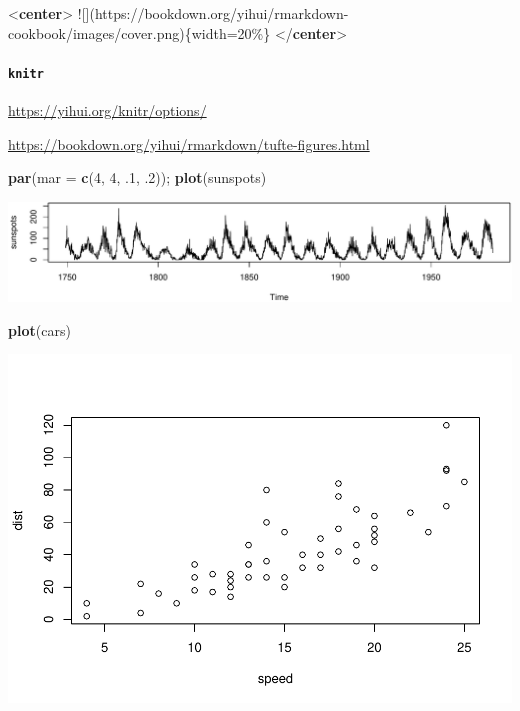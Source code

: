 \documentclass[
]{book}
\newenvironment{Shaded}{\begin{snugshade}}{\end{snugshade}}
\newcommand{\AlertTok}[1]{\textcolor[rgb]{0.94,0.16,0.16}{#1}}
\newcommand{\AttributeTok}[1]{\textcolor[rgb]{0.13,0.29,0.53}{#1}}
\newcommand{\DataTypeTok}[1]{\textcolor[rgb]{0.13,0.29,0.53}{#1}}
\newcommand{\DecValTok}[1]{\textcolor[rgb]{0.00,0.00,0.81}{#1}}
\newcommand{\FunctionTok}[1]{\textcolor[rgb]{0.13,0.29,0.53}{\textbf{#1}}}
\newcommand{\KeywordTok}[1]{\textcolor[rgb]{0.13,0.29,0.53}{\textbf{#1}}}
\newcommand{\NormalTok}[1]{#1}
\theoremstyle{definition}
\theoremstyle{definition}
\theoremstyle{definition}
\theoremstyle{definition}
\theoremstyle{remark}
\begin{document}
\begin{Shaded}
\begin{Highlighting}[]
\DataTypeTok{\textless{}}\KeywordTok{center}\DataTypeTok{\textgreater{}}
\AlertTok{![](https://bookdown.org/yihui/rmarkdown{-}cookbook/images/cover.png)}\NormalTok{\{width=20\%\}}
\DataTypeTok{\textless{}/}\KeywordTok{center}\DataTypeTok{\textgreater{}}
\end{Highlighting}
\end{Shaded}

\paragraph{\texorpdfstring{\texttt{knitr}}{knitr}}\label{knitr}

\url{https://yihui.org/knitr/options/}

\url{https://bookdown.org/yihui/rmarkdown/tufte-figures.html}

\begin{Shaded}
\begin{Highlighting}[]
\FunctionTok{par}\NormalTok{(}\AttributeTok{mar =} \FunctionTok{c}\NormalTok{(}\DecValTok{4}\NormalTok{, }\DecValTok{4}\NormalTok{, .}\DecValTok{1}\NormalTok{, .}\DecValTok{2}\NormalTok{)); }\FunctionTok{plot}\NormalTok{(sunspots)}
\end{Highlighting}
\end{Shaded}

\includegraphics{202401280001-test_files/figure-latex/unnamed-chunk-11-1.pdf}

\begin{Shaded}
\begin{Highlighting}[]
\FunctionTok{plot}\NormalTok{(cars)}
\end{Highlighting}
\end{Shaded}

\includegraphics{202401280001-test_files/figure-latex/fig-margin-1.pdf}
\end{document}
